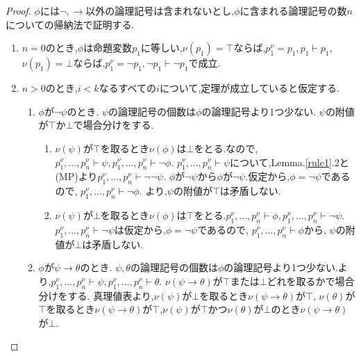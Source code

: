 \begin{proof}
 $\phi$には$\lnot, \to$以外の論理記号は含まれないとし,$\phi$に含まれる論理記号の数$n$についての帰納法で証明する.
 \begin{enumerate}
  \item $n=0$のとき,$\phi$は命題変数$p_1$に等しい,$\nu(p_1)=\top$ならば,$p_1^{\nu}=p_1, p_1 \vdash p_1$,$\nu(p_1)=\bot$ならば,$p_1^{\nu}=\lnot p_1, \lnot p_1 \vdash \lnot p_1$で成立.
  \item $n>0$のとき,$i<k$なるすべての$i$について,定理が成立していると仮定する.
		\begin{enumerate}
		 \renewcommand{\labelenumii}{\arabic{enumii})}
		 \renewcommand{\labelenumiii}{(\roman{enumiii})}
		 \item $\phi$が$\lnot \psi$のとき. \newline
			   $\psi$の論理記号の個数は$\phi$の論理記号より1つ少ない.
			   $\psi$の附値が$\top$か$\bot$で場合分けをする.
			   \begin{enumerate}
				\item $\nu(\psi)$が$\top$を取るとき$\nu(\phi)$は$\bot$をとる.なので,$p_1^{\nu},...,p_n^{\nu} \vdash \psi, p_1^{\nu},...,p_n^{\nu} \vdash \lnot \phi$.
					  $p_1^{\nu},...,p_n^{\nu} \vdash \psi$について,Lemma.\ref{rule1}.2と(MP)より$p_1^{\nu},...,p_n^{\nu} \vdash \lnot \lnot \psi$.
					  $\phi$が$\lnot \psi$から$\phi$が$\lnot \psi$.仮定から,$\phi=\lnot \psi$であるので, $p_1^{\nu},...,p_n^{\nu} \vdash \lnot \phi$.
					  より,$\psi$の附値が$\top$は矛盾しない.
				\item $\nu(\psi)$が$\bot$を取るとき$\nu(\phi)$は$\top$をとる.$p_1^{\nu},...,p_n^{\nu} \vdash \phi, p_1^{\nu},...,p_n^{\nu} \vdash \lnot \psi$.
					  $p_1^{\nu},...,p_n^{\nu} \vdash \lnot \psi$は仮定から,$\phi=\lnot \psi$であるので, $p_1^{\nu},...,p_n^{\nu} \vdash \phi$から,
					  $\psi$の附値が$\bot$は矛盾しない.
			   \end{enumerate}
		 \item $\phi$が$\psi \to \theta$のとき. \newline
			   $\psi,\theta$の論理記号の個数は$\phi$の論理記号より1つ少ない.より,$p_1^{\nu},...,p_n^{\nu} \vdash \psi, p_1^{\nu},...,p_n^{\nu} \vdash \theta$.
			   $\nu(\psi \to \theta)$が$\top$または$\bot$どれを取るかで場合分けをする. 真理値表より,$\nu(\psi)$が$\bot$を取るとき$\nu(\psi \to \theta)$が$\top$,
			   $\nu(\theta)$が$\top$を取るとき$\nu(\psi \to \theta)$が$\top$,$\nu(\psi)$が$\top$かつ$\nu(\theta)$が$\bot$のとき$\nu(\psi \to \theta)$が$\bot$.
			   \begin{enumerate}

\end{enumerate}
\end{enumerate}
\end{enumerate}
\end{proof}
